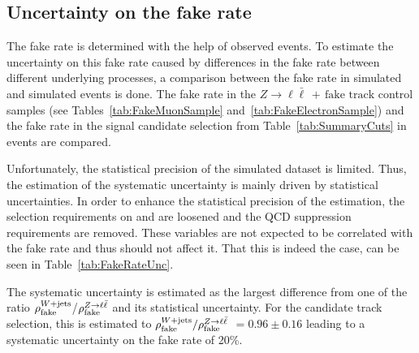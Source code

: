 \subsection{Uncertainty on the fake rate}
\label{sec:FakeRateUncertainty}
The fake rate \fakerate is determined with the help of observed \Zlep events.
To estimate the uncertainty on this fake rate caused by differences in the fake rate between different underlying processes, a comparison between the fake rate in simulated \ZlepJets and simulated \WJets events is done.
The fake rate in the $Z\rightarrow\ell \bar{\ell}\,+\,\text{fake track}$  control samples (see Tables~\ref{tab:FakeMuonSample} and~\ref{tab:FakeElectronSample}) 
and the fake rate in the signal candidate selection from Table~\ref{tab:SummaryCuts} in \WJets events are compared.

Unfortunately, the statistical precision of the simulated \WJets dataset is limited.
Thus, the estimation of the systematic uncertainty is mainly driven by statistical uncertainties.
In order to enhance the statistical precision of the estimation, the selection requirements on \met and \ptfirstjet are loosened and the QCD suppression requirements are removed.
These variables are not expected to be correlated with the fake rate and thus should not affect it.
That this is indeed the case, can be seen in Table~\ref{tab:FakeRateUnc}.

The systematic uncertainty is estimated as the largest difference from one of the ratio $\rho_{\text{fake}}^{W+\text{jets}}$/$\rho_{\text{fake}}^{Z\rightarrow\ell\bar{\ell}}$ and its statistical uncertainty.
For the candidate track selection, this is estimated to $\rho_{\text{fake}}^{W+\text{jets}}/\rho_{\text{fake}}^{Z\rightarrow\ell\bar{\ell}}$ $ =  0.96 \pm 0.16 $ leading to a systematic uncertainty on the fake rate of 20\%.

